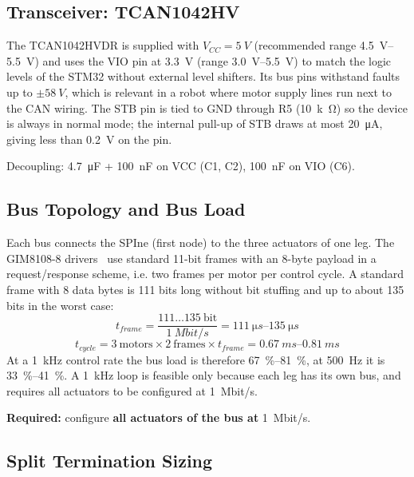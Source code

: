 \documentclass[11pt,a4paper]{article}
\newcommand{\required}[1]{\begin{reqbox}\textbf{\color{reqred}Required:} #1\end{reqbox}}
\begin{document}
\subsection{Transceiver: TCAN1042HV}

The TCAN1042HVDR is supplied with $V_{CC} = \qty{5}{V}$ (recommended range \qtyrange{4.5}{5.5}{V}) and
uses the VIO pin at \qty{3.3}{V} (range \qtyrange{3.0}{5.5}{V}) to match the logic levels of the STM32 without
external level shifters. Its bus pins withstand faults up to $\pm\qty{58}{V}$, which is relevant in a robot
where motor supply lines run next to the CAN wiring. The STB pin is tied to GND through
R5 (\qty{10}{k\ohm}) so the device is always in normal mode; the internal pull-up of STB draws at most
\qty{20}{\micro A}, giving less than \qty{0.2}{V} on the pin.

Decoupling: \qty{4.7}{\micro F} + \qty{100}{nF} on VCC (C1, C2), \qty{100}{nF} on VIO (C6).

\subsection{Bus Topology and Bus Load}\label{sec:busload}

Each bus connects the SPIne (first node) to the three actuators of one leg. The GIM8108-8
drivers~\cite{steadywin} use standard 11-bit frames with an 8-byte payload in a request/response scheme, i.e.
two frames per motor per control cycle. A standard frame with 8 data bytes is 111 bits long
without bit stuffing and up to about 135 bits in the worst case:
\begin{equation}
t_{frame} = \frac{111\dots135\ \text{bit}}{\qty{1}{Mbit/s}} = \qtyrange{111}{135}{\micro s}
\end{equation}
\begin{equation}
t_{cycle} = 3\ \text{motors} \times 2\ \text{frames} \times t_{frame} = \qtyrange{0.67}{0.81}{ms}
\end{equation}
At a \qty{1}{kHz} control rate the bus load is therefore \qtyrange{67}{81}{\percent}, at \qty{500}{Hz} it is \qtyrange{33}{41}{\percent}. A
\qty{1}{kHz} loop is feasible only because each leg has its own bus, and requires all actuators to be
configured at \qty{1}{Mbit/s}.

\required{configure \textbf{all actuators of the bus at} \qty{1}{Mbit/s}.}

\subsection{Split Termination Sizing}\label{sec:termination}
\end{document}
